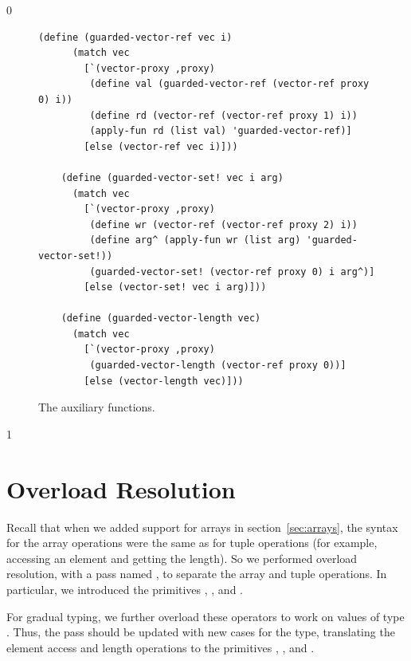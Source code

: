 \documentclass[7x10]{TimesAPriori_MIT}%
\def\racketEd{0}
\def\pythonEd{1}
\def\edition{1}
\newcommand{\pythonColor}[0]{}
\numberwithin{theorem}{chapter}
\numberwithin{definition}{chapter}
\numberwithin{equation}{chapter}
\begin{document}
{\if\edition\racketEd    
\begin{figure}[tbp]
\begin{tcolorbox}[colback=white]  
\begin{lstlisting}[basicstyle=\ttfamily\footnotesize]
    (define (guarded-vector-ref vec i)
      (match vec
        [`(vector-proxy ,proxy)
         (define val (guarded-vector-ref (vector-ref proxy 0) i))
         (define rd (vector-ref (vector-ref proxy 1) i))
         (apply-fun rd (list val) 'guarded-vector-ref)]
        [else (vector-ref vec i)]))
        
    (define (guarded-vector-set! vec i arg)
      (match vec
        [`(vector-proxy ,proxy)
         (define wr (vector-ref (vector-ref proxy 2) i))
         (define arg^ (apply-fun wr (list arg) 'guarded-vector-set!))
         (guarded-vector-set! (vector-ref proxy 0) i arg^)]
        [else (vector-set! vec i arg)]))
        
    (define (guarded-vector-length vec)
      (match vec
        [`(vector-proxy ,proxy)
         (guarded-vector-length (vector-ref proxy 0))]
        [else (vector-length vec)]))
\end{lstlisting}
\end{tcolorbox}

\caption{The  auxiliary functions.}
  \label{fig:guarded-tuple}
\end{figure}
\fi}

{\if\edition\pythonEd\pythonColor
\section{Overload Resolution }
\label{sec:gradual-resolution}

Recall that when we added support for arrays in
section~\ref{sec:arrays}, the syntax for the array operations were the
same as for tuple operations (for example, accessing an element and
getting the length). So we performed overload resolution, with a pass
named , to separate the array and tuple operations.  In
particular, we introduced the primitives ,
, and .

For gradual typing, we further overload these operators to work on
values of type \CANYTY{}. Thus, the  pass should be
updated with new cases for the \CANYTY{} type, translating the element
access and length operations to the primitives ,
, and .

\fi}
\end{document}
